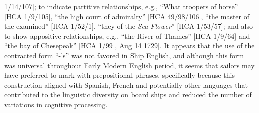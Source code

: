 1/14/107]; to indicate partitive relationships, e.g., “What troopers of horse” [HCA 1/9/105], “the high court of admiralty” [HCA 49/98/106], “the master of the examined” [HCA 1/52/1], “they of the \textit{Sea Flower}” [HCA 1/53/57]; and also to show appositive relationships, e.g., “the River of Thames” [HCA 1/9/64] and “the bay of Chesepeak” [HCA 1/99 , Aug 14 1729]. It appears that the use of the contracted form “-’s” was not favored in Ship English, and although this form was universal throughout Early Modern English period, it seems that sailors may have preferred to mark  with prepositional phrases, specifically because this construction aligned with Spanish, French and potentially other languages that contributed to the linguistic diversity on board ships and reduced the number of variations in cognitive processing.


